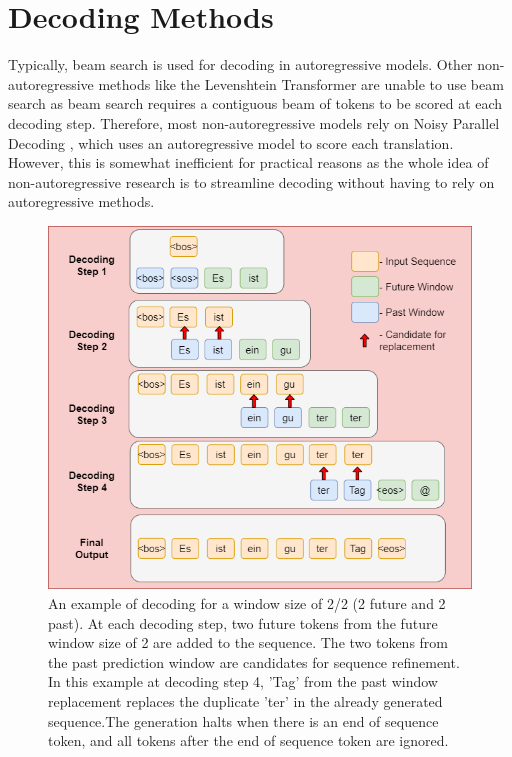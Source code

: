 \section{Decoding Methods} \label{sec:decoding_methods}
Typically, beam search is used for decoding in autoregressive models. Other non-autoregressive methods like the Levenshtein Transformer \cite{gu_levenshtein_2019} are unable to use beam search as beam search requires a contiguous beam of tokens to be scored at each decoding step. Therefore, most non-autoregressive models rely on Noisy Parallel Decoding \cite{gu_non-autoregressive_2018}, which uses an autoregressive model to score each translation. However, this is somewhat inefficient for practical reasons as the whole idea of non-autoregressive research is to streamline decoding without having to rely on autoregressive methods. 

\begin{figure}[hpbt!]

    \centering
    \includegraphics[width=\textwidth]{images/chap04_images/decoding.png}
    \caption{An example of decoding for a window size of 2/2 (2 future and 2 past). At each decoding step, two future tokens from the future window size of 2 are added to the sequence. The two tokens from the past prediction window are candidates for sequence refinement. In this example at decoding step 4, 'Tag' from the past window replacement replaces the duplicate 'ter' in the already generated sequence.The generation halts when there is an end of sequence token, and all tokens after the end of sequence token are ignored.}
    \label{fig:decoding_example}
\end{figure}

